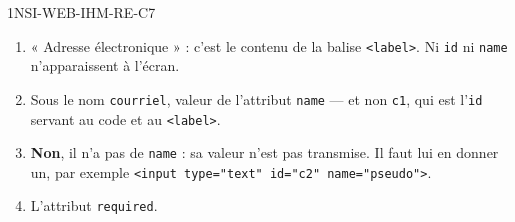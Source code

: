 \begin{corrige}{1NSI-WEB-IHM-RE-C7}
\begin{enumerate}
  \item « Adresse électronique » : c'est le contenu de la balise \lstinline{<label>}. Ni
        \lstinline{id} ni \lstinline{name} n'apparaissent à l'écran.
  \item Sous le nom \lstinline{courriel}, valeur de l'attribut \lstinline{name} — et non
        \lstinline{c1}, qui est l'\lstinline{id} servant au code et au \lstinline{<label>}.
  \item \textbf{Non}, il n'a pas de \lstinline{name} : sa valeur n'est pas transmise. Il faut
        lui en donner un, par exemple
        \lstinline{<input type="text" id="c2" name="pseudo">}.
  \item L'attribut \lstinline{required}.
\end{enumerate}
\end{corrige}
